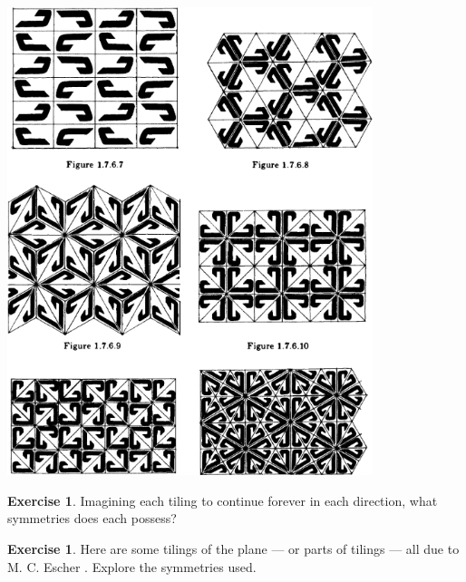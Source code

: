 \documentclass[a4paper]{report}
\theoremstyle{definition}
\newtheorem{exercise}[thm]{Exercise}
\begin{document}
\begin{center}
    \includegraphics[width=0.8\textwidth]{tilings2}
  \end{center}

  \begin{exercise}
    Imagining each tiling to continue forever in each direction, what symmetries does each possess?
  \end{exercise}

  \begin{exercise}
    Here are some tilings of the plane --- or parts of tilings --- all due to M. C. Escher \autocite{escher}. Explore
    the symmetries used.
  \end{exercise}
\end{document}
